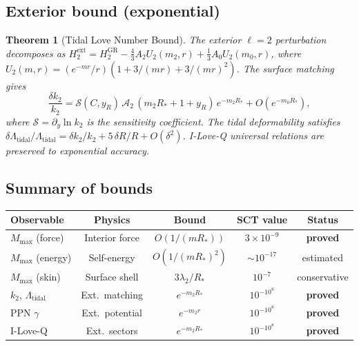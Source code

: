 \documentclass[12pt,a4paper]{article}
\newtheorem{theorem}{Theorem}[section]
\newcommand{\Mmax}{M_{\mathrm{max}}}
\newcommand{\Rstar}{R_*}
\begin{document}
\subsection{Exterior bound (exponential)}

\begin{theorem}[Tidal Love Number Bound]
\label{thm:k2-exp}
The exterior $\ell=2$ perturbation decomposes as
$H_2^{\mathrm{ext}} = H_2^{\mathrm{GR}} - \frac{4}{3}A_2 U_2(m_2,r)
+ \frac{1}{3}A_0 U_2(m_0,r)$,
where $U_2(m,r) = (e^{-mr}/r)(1 + 3/(mr) + 3/(mr)^2)$.
The surface matching gives
\begin{equation}\label{eq:dk2}
  \frac{\delta k_2}{k_2} = \mathcal{S}(C,y_R)\,\mathcal{A}_2\,
  (m_2\Rstar + 1 + y_R)\,e^{-m_2\Rstar} + O(e^{-m_0\Rstar}),
\end{equation}
where $\mathcal{S} = \partial_y \ln k_2$ is the sensitivity coefficient.
The tidal deformability satisfies
$\delta\Lambda_{\mathrm{tidal}}/\Lambda_{\mathrm{tidal}}
= \delta k_2/k_2 + 5\,\delta R/R + O(\delta^2)$.
I-Love-Q universal relations are preserved to exponential accuracy.
\end{theorem}

\subsection{Summary of bounds}

\begin{center}
\begin{tabular}{lcccc}
\toprule
\textbf{Observable} & \textbf{Physics} & \textbf{Bound} & \textbf{SCT value} & \textbf{Status} \\
\midrule
$\Mmax$ (force) & Interior force & $O(1/(m\Rstar))$ & $3 \times 10^{-9}$ & \textbf{proved} \\
$\Mmax$ (energy) & Self-energy & $O(1/(m\Rstar)^2)$ & $\sim 10^{-17}$ & estimated \\
$\Mmax$ (skin) & Surface shell & $3\lambda_2/\Rstar$ & $10^{-7}$ & conservative \\
$k_2$, $\Lambda_{\mathrm{tidal}}$ & Ext.\ matching & $e^{-m_2\Rstar}$ & $10^{-10^8}$ & \textbf{proved} \\
PPN $\gamma$ & Ext.\ potential & $e^{-m_2 r}$ & $10^{-10^8}$ & \textbf{proved} \\
I-Love-Q & Ext.\ sectors & $e^{-m_2\Rstar}$ & $10^{-10^8}$ & \textbf{proved} \\
\bottomrule
\end{tabular}
\end{center}
\end{document}
